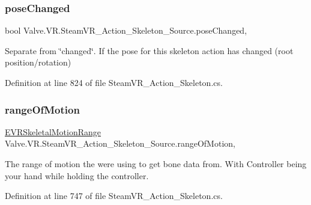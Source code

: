 \subsubsection{\texorpdfstring{poseChanged}{poseChanged}}
{\footnotesize\ttfamily bool Valve.\+V\+R.\+Steam\+V\+R\+\_\+\+Action\+\_\+\+Skeleton\+\_\+\+Source.\+pose\+Changed\hspace{0.3cm}{\ttfamily [get]}, {}}



Separate from \char`\"{}changed\char`\"{}. If the pose for this skeleton action has changed (root position/rotation) 



Definition at line 824 of file Steam\+V\+R\+\_\+\+Action\+\_\+\+Skeleton.\+cs.

\mbox{\label{class_valve_1_1_v_r_1_1_steam_v_r___action___skeleton___source_a40dadbdfafff861ded2fbca0b7a28a32}} 
\subsubsection{\texorpdfstring{rangeOfMotion}{rangeOfMotion}}
{\footnotesize\ttfamily \mbox{\hyperlink{namespace_valve_1_1_v_r_affc8d18345f8f5d36f1ae7b4ce534500}{E\+V\+R\+Skeletal\+Motion\+Range}} Valve.\+V\+R.\+Steam\+V\+R\+\_\+\+Action\+\_\+\+Skeleton\+\_\+\+Source.\+range\+Of\+Motion\hspace{0.3cm}{\ttfamily [get]}, {\ttfamily [set]}}



The range of motion the we\textquotesingle{}re using to get bone data from. With Controller being your hand while holding the controller. 



Definition at line 747 of file Steam\+V\+R\+\_\+\+Action\+\_\+\+Skeleton.\+cs.

\mbox{\label{class_valve_1_1_v_r_1_1_steam_v_r___action___skeleton___source_a42e383285b52b18d4ab8e6e095895846}} 
